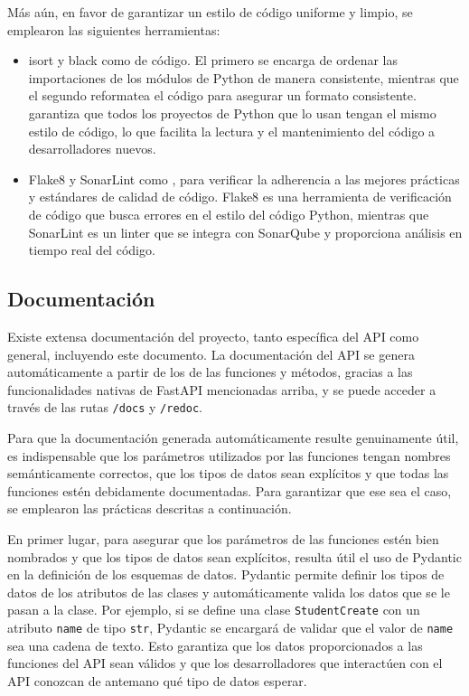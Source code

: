 Más aún, en favor de garantizar un estilo de código uniforme y limpio, se emplearon las siguientes herramientas:
\begin{itemize}
	\item \gls{isort} y \gls{black} como  de código. El primero se encarga de ordenar las importaciones de los módulos de \gls{Python} de manera consistente, mientras que el segundo reformatea el código para asegurar un formato consistente.  garantiza que todos los proyectos de \gls{Python} que lo usan tengan el mismo estilo de código, lo que facilita la lectura y el mantenimiento del código a desarrolladores nuevos.
	\item \gls{Flake8} y \gls{SonarLint} como , para verificar la adherencia a las mejores prácticas y estándares de calidad de código. \gls{Flake8} es una herramienta de verificación de código que busca errores en el estilo del código \gls{Python}, mientras que \gls{SonarLint} es un \gls{linter} que se integra con \gls{SonarQube} y proporciona análisis en tiempo real del código.
\end{itemize}

\subsection{Documentación}

Existe extensa documentación del proyecto, tanto específica del API como general, incluyendo este documento. La documentación del \gls{API} se genera automáticamente a partir de los  de las funciones y métodos, gracias a las funcionalidades nativas de \gls{FastAPI} mencionadas arriba, y se puede acceder a través de las rutas \verb|/docs| y \verb|/redoc|.

Para que la documentación generada automáticamente resulte genuinamente útil, es indispensable que los parámetros utilizados por las funciones tengan nombres semánticamente correctos, que los tipos de datos sean explícitos y que todas las funciones estén debidamente documentadas. Para garantizar que ese sea el caso, se emplearon las prácticas descritas a continuación.

En primer lugar, para asegurar que los parámetros de las funciones estén bien nombrados y que los tipos de datos sean explícitos, resulta útil el uso de \gls{Pydantic} en la definición de los esquemas de datos. \gls{Pydantic} permite definir los tipos de datos de los atributos de las clases y automáticamente valida los datos que se le pasan a la clase. Por ejemplo, si se define una clase \lstinline|StudentCreate| con un atributo \lstinline|name| de tipo \lstinline|str|, \gls{Pydantic} se encargará de validar que el valor de \lstinline|name| sea una cadena de texto. Esto garantiza que los datos proporcionados a las funciones del \gls{API} sean válidos y que los desarrolladores que interactúen con el \gls{API} conozcan de antemano qué tipo de datos esperar.

